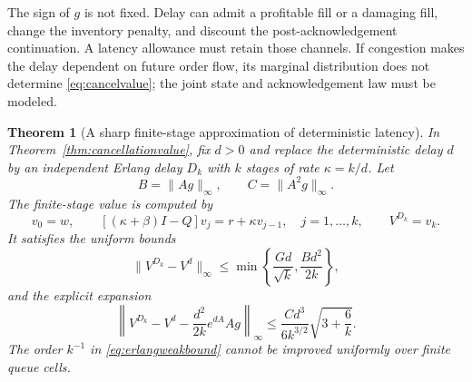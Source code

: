 \documentclass[11pt]{article}
\theoremstyle{plain}
\newtheorem{theorem}{Theorem}[section]
\theoremstyle{definition}
\theoremstyle{remark}
\begin{document}
The sign of \(g\) is not fixed. Delay can admit a profitable fill
or a damaging fill, change the inventory penalty, and discount the
post-acknowledgement continuation. A latency allowance must retain
those channels. If congestion makes the delay dependent on future
order flow, its marginal distribution does not determine
\eqref{eq:cancelvalue}; the joint state and acknowledgement law
must be modeled.

\begin{theorem}[A sharp finite-stage approximation of deterministic latency]
\label{thm:erlanglatency}
In Theorem~\ref{thm:cancellationvalue}, fix \(d>0\) and replace the
deterministic delay \(d\) by an independent Erlang delay \(D_k\)
with \(k\) stages of rate \(\kappa=k/d\). Let
\[
 B=\|Ag\|_\infty,\qquad C=\|A^2g\|_\infty.
\]
The finite-stage value is computed by
\begin{equation}\label{eq:erlangrecursion}
 v_0=w,\qquad
 [(\kappa+\beta)I-Q]v_j=r+\kappa v_{j-1},
 \quad j=1,\ldots,k,\qquad V^{D_k}=v_k .
\end{equation}
It satisfies the uniform bounds
\begin{equation}\label{eq:erlangweakbound}
 \|V^{D_k}-V^d\|_\infty
 \le\min\left\{\frac{Gd}{\sqrt{k}},\frac{Bd^2}{2k}\right\},
\end{equation}
and the explicit expansion
\begin{equation}\label{eq:erlangexpansion}
 \left\|V^{D_k}-V^d-
          \frac{d^2}{2k}e^{dA}Ag\right\|_\infty
 \le \frac{Cd^3}{6k^{3/2}}\sqrt{3+\frac6k}.
\end{equation}
The order \(k^{-1}\) in \eqref{eq:erlangweakbound} cannot be
improved uniformly over finite queue cells.
\end{theorem}
\end{document}
